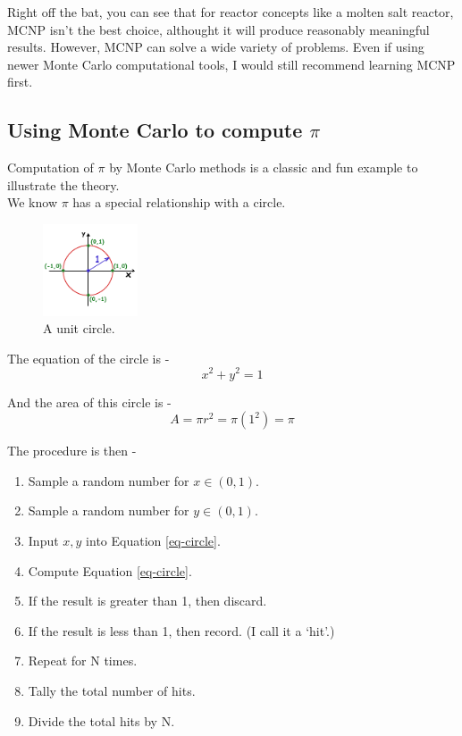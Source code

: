 \documentclass[11pt,a4paper]{article}
\begin{document}
\noindent Right off the bat, you can see that for reactor concepts like a molten salt reactor, MCNP isn't the best choice, althought it will produce reasonably meaningful results. However, MCNP can solve a wide variety of problems. Even if using newer Monte Carlo computational tools, I would still recommend learning MCNP first.  

\subsection{Using Monte Carlo to compute $\pi$}
\noindent Computation of $\pi$ by Monte Carlo methods is a classic and fun example to illustrate the theory.\\

\noindent We know $\pi$ has a special relationship with a circle. 

\begin{figure}[h!]
    \centering
    \includegraphics[width=0.25\textwidth]{circle.png}
    \caption{A unit circle.}
    \label{fig-circle}
\end{figure}

\noindent The equation of the circle is - 
\begin{equation} \label{eq-circle}
    x^2 + y^2 = 1
\end{equation}

\noindent And the area of this circle is - 
\begin{equation} \label{eq-area}
    A = \pi r^2 = \pi (1^2) = \pi
\end{equation}

\noindent The procedure is then - 
\begin{enumerate}[topsep=0pt,itemsep=-1ex,partopsep=1ex,parsep=1ex]
    \item Sample a random number for $x \in (0,1)$.
    \item Sample a random number for $y \in (0,1)$.
    \item Input $x,y$ into Equation \ref{eq-circle}.
    \item Compute Equation \ref{eq-circle}.
    \item If the result is greater than 1, then discard.
    \item If the result is less than 1, then record. (I call it a `hit'.)
    \item Repeat for N times. 
    \item Tally the total number of hits. 
    \item Divide the total hits by N.
\end{enumerate}
\vspace*{\baselineskip}
\end{document}
